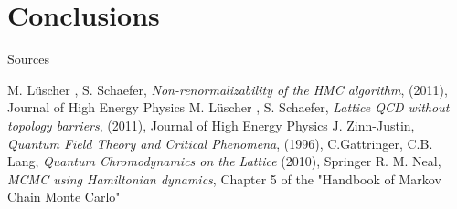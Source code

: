 \documentclass[10pt]{beamer}
\begin{document}
\section{Conclusions}

\begin{frame}{Sources}
    
\begin{thebibliography}{99}
        M. L{\"{u}}scher , S. Schaefer,
        {\em Non-renormalizability of the HMC algorithm},
        (2011),
        Journal of High Energy Physics
        M. L{\"{u}}scher , S. Schaefer,
        {\em Lattice QCD without topology barriers},
        (2011),
        Journal of High Energy Physics
        J. Zinn-Justin,
        {\em Quantum Field Theory and Critical Phenomena},
        (1996),
        C.Gattringer, C.B. Lang,
        {\em Quantum Chromodynamics on the Lattice}
        (2010),
        Springer
        R. M. Neal, 
        {\em MCMC using Hamiltonian dynamics},
        Chapter 5 of the "Handbook of Markov Chain Monte Carlo"
\end{thebibliography}
\end{frame}
\end{document}
